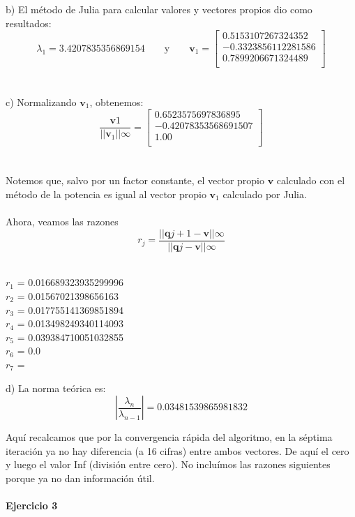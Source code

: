 \documentclass[11pt]{article}
\begin{document}
b) El método de Julia para calcular valores y vectores propios dio como resultados:
\[
 \lambda_1 = 3.4207835356869154
 \qquad\text{y}\qquad
 \textbf{v}_1 = \begin{bmatrix}
0.5153107267324352 \\
-0.3323856112281586 \\
0.7899206671324489 \\
\end{bmatrix}
 \]
 \\
 \\

 c) Normalizando $\textbf{v}_1$, obtenemos:
 $$\frac{\textbf{v}1}{||\textbf{v}_1||\infty} =
\begin{bmatrix}
0.6523575697836895 \\
-0.42078353568691507 \\
1.00 \\
\end{bmatrix}$$
\\
\\

Notemos que, salvo por un factor constante, el vector propio $\textbf{v}$ calculado con el método de la potencia es igual al vector propio $\textbf{v}_1$ calculado por Julia.
\\
\\

Ahora, veamos las razones
$$
r_j = \frac{||\textbf{q}{j+1} - \textbf{v}||\infty}{||\textbf{q}{j} - \textbf{v}||\infty}
$$
\\

\begin{multicols}{3}
\noindent
$ r_{1} $ = 0.016689323935299996 \\
$ r_{2} $ = 0.01567021398656163 \\
$ r_{3} $ = 0.017755141369851894 \\
$ r_{4} $ = 0.013498249340114093 \\
$ r_{5} $ = 0.039384710051032855 \\
$ r_{6} $ = 0.0 \\
$ r_{7} $ =  \\
\end{multicols}



d) La norma teórica es:
$$
\left| \frac{\lambda_n}{\lambda_{n-1}} \right| = 0.03481539865981832
$$

Aquí recalcamos que por la convergencia rápida del algoritmo, en la séptima
iteración ya no hay diferencia (a 16 cifras) entre ambos vectores. De aquí el
cero y luego el valor Inf (división entre cero). No incluímos las razones
siguientes porque ya no dan información útil.
\noindent
\\
\\
\noindent
\textbf{Ejercicio 3}
\end{document}
